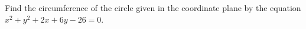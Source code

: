 Find the circumference of the circle given in the coordinate plane by the equation $x^{2}+y^{2}+2x+6y-26=0$.
